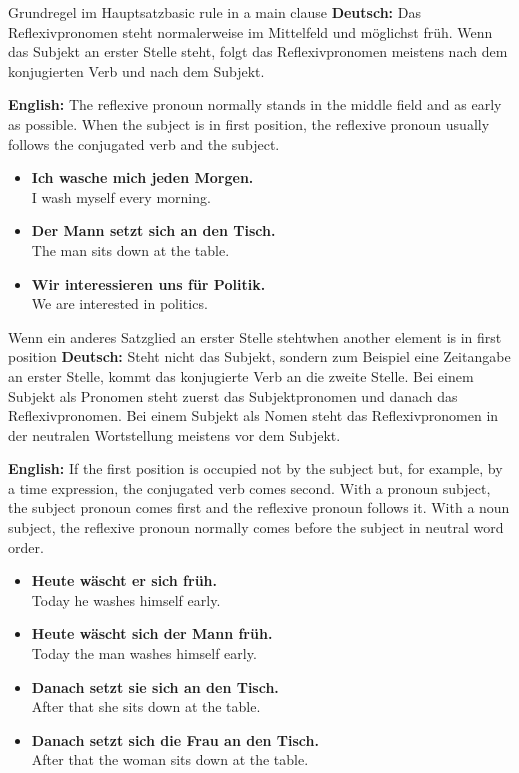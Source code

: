 \documentclass[a4paper,11pt]{article}
\newcommand{\GermanText}[1]{\textbf{Deutsch: }#1\par}
\newcommand{\EnglishText}[1]{{\small\color{SoftGray}\textbf{English: }#1\par}}
\newcommand{\ExampleItem}[2]{\item \textbf{#1}\\{\small\color{SoftGray}#2}}
\begin{document}
        \begin{grammarentry}{Grundregel im Hauptsatz}{basic rule in a main clause}
            \GermanText{Das Reflexivpronomen steht normalerweise im Mittelfeld und möglichst früh. Wenn das Subjekt an erster Stelle steht, folgt das Reflexivpronomen meistens nach dem konjugierten Verb und nach dem Subjekt.}
            \EnglishText{The reflexive pronoun normally stands in the middle field and as early as possible. When the subject is in first position, the reflexive pronoun usually follows the conjugated verb and the subject.}

            \begin{exbox}
                \begin{itemize}
                    \ExampleItem{Ich wasche mich jeden Morgen.}{I wash myself every morning.}
                    \ExampleItem{Der Mann setzt sich an den Tisch.}{The man sits down at the table.}
                    \ExampleItem{Wir interessieren uns für Politik.}{We are interested in politics.}
                \end{itemize}
            \end{exbox}
        \end{grammarentry}

        \begin{grammarentry}{Wenn ein anderes Satzglied an erster Stelle steht}{when another element is in first position}
            \GermanText{Steht nicht das Subjekt, sondern zum Beispiel eine Zeitangabe an erster Stelle, kommt das konjugierte Verb an die zweite Stelle. Bei einem Subjekt als Pronomen steht zuerst das Subjektpronomen und danach das Reflexivpronomen. Bei einem Subjekt als Nomen steht das Reflexivpronomen in der neutralen Wortstellung meistens vor dem Subjekt.}
            \EnglishText{If the first position is occupied not by the subject but, for example, by a time expression, the conjugated verb comes second. With a pronoun subject, the subject pronoun comes first and the reflexive pronoun follows it. With a noun subject, the reflexive pronoun normally comes before the subject in neutral word order.}

            \begin{exbox}
                \begin{itemize}
                    \ExampleItem{Heute wäscht er sich früh.}{Today he washes himself early.}
                    \ExampleItem{Heute wäscht sich der Mann früh.}{Today the man washes himself early.}
                    \ExampleItem{Danach setzt sie sich an den Tisch.}{After that she sits down at the table.}
                    \ExampleItem{Danach setzt sich die Frau an den Tisch.}{After that the woman sits down at the table.}
                \end{itemize}
            \end{exbox}
        \end{grammarentry}
\end{document}
